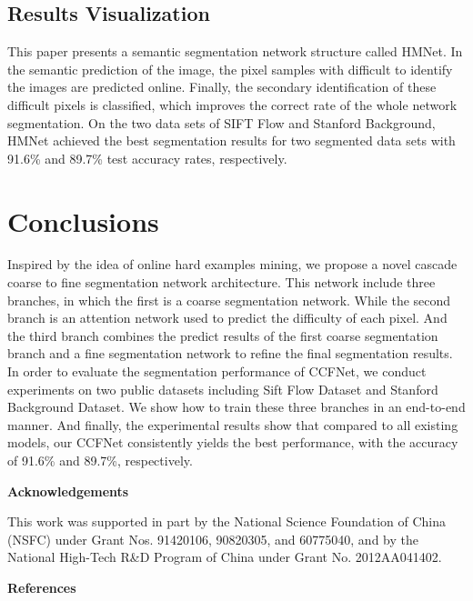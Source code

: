 \documentclass[10.5pt,compsoc]{TsT}
\theoremstyle{mystyle}
\begin{document}
{\subsection{Results Visualization}
\noindent
This paper presents a semantic segmentation network structure called HMNet. In the semantic prediction of the image, the pixel samples with difficult to identify the images are predicted online. Finally, the secondary identification of these difficult pixels is classified, which improves the correct rate of the whole network segmentation. On the two data sets of SIFT Flow and Stanford Background, HMNet achieved the best segmentation results for two segmented data sets with 91.6\% and 89.7\% test accuracy rates, respectively.


\section{Conclusions}
\noindent

Inspired by the idea of online hard examples mining, we propose a novel cascade coarse to fine segmentation network architecture.
This network include three branches, in which the first is a coarse segmentation network.
While the second branch is an attention network used to predict the difficulty of each pixel.
And the third branch combines the predict results of the first coarse segmentation branch and a fine segmentation network to refine the final segmentation results.
In order to evaluate the segmentation performance of CCFNet, we conduct experiments on two public datasets including Sift Flow Dataset and Stanford Background Dataset. 
We show how to train these three branches in an end-to-end manner. And finally, the experimental results show that compared to all existing models, our CCFNet consistently yields the best performance, with the accuracy of 91.6\% and 89.7\%, respectively.


\vskip 2mm
\noindent
\textbf{Acknowledgements}
\vskip 2mm

\noindent
This work was supported in part by the National Science Foundation of China (NSFC) under Grant Nos. 91420106, 90820305, and 60775040, and by the National High-Tech R\&D Program of China under Grant No. 2012AA041402.

\vskip 2mm
\noindent
\textbf{References}
\vskip 2mm


\begin{thebibliography}{99}
 \addtolength{\itemsep}{-1em}
\vspace {1.5mm}


\end{thebibliography}}
\end{document}
